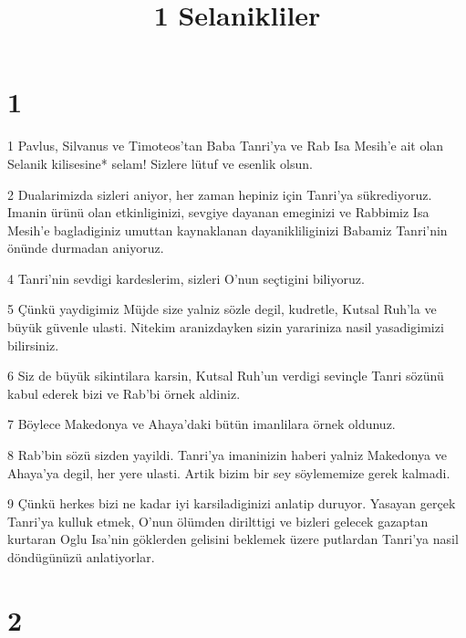 

\title{1 Selanikliler}


\chapter{1}

\par 1 Pavlus, Silvanus ve Timoteos'tan Baba Tanri'ya ve Rab Isa Mesih'e ait olan Selanik kilisesine* selam! Sizlere lütuf ve esenlik olsun.
\par 2 Dualarimizda sizleri aniyor, her zaman hepiniz için Tanri'ya sükrediyoruz. Imanin ürünü olan etkinliginizi, sevgiye dayanan emeginizi ve Rabbimiz Isa Mesih'e bagladiginiz umuttan kaynaklanan dayanikliliginizi Babamiz Tanri'nin önünde durmadan aniyoruz.
\par 4 Tanri'nin sevdigi kardeslerim, sizleri O'nun seçtigini biliyoruz.
\par 5 Çünkü yaydigimiz Müjde size yalniz sözle degil, kudretle, Kutsal Ruh'la ve büyük güvenle ulasti. Nitekim aranizdayken sizin yarariniza nasil yasadigimizi bilirsiniz.
\par 6 Siz de büyük sikintilara karsin, Kutsal Ruh'un verdigi sevinçle Tanri sözünü kabul ederek bizi ve Rab'bi örnek aldiniz.
\par 7 Böylece Makedonya ve Ahaya'daki bütün imanlilara örnek oldunuz.
\par 8 Rab'bin sözü sizden yayildi. Tanri'ya imaninizin haberi yalniz Makedonya ve Ahaya'ya degil, her yere ulasti. Artik bizim bir sey söylememize gerek kalmadi.
\par 9 Çünkü herkes bizi ne kadar iyi karsiladiginizi anlatip duruyor. Yasayan gerçek Tanri'ya kulluk etmek, O'nun ölümden dirilttigi ve bizleri gelecek gazaptan kurtaran Oglu Isa'nin göklerden gelisini beklemek üzere putlardan Tanri'ya nasil döndügünüzü anlatiyorlar.

\chapter{2}

